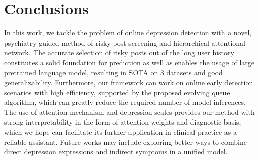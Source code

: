 \section{Conclusions}

In this work, we tackle the problem of online depression detection with a novel, psychiatry-guided method of risky post screening and hierarchical attentional network. The accurate selection of risky posts out of the long user history constitutes a solid foundation for prediction as well as enables the usage of large pretrained language model, resulting in SOTA on 3 datasets and good generalizability. Furthermore, our framework can work on online early detection scenarios with high efficiency, supported by the proposed evolving queue algorithm, which can greatly reduce the required number of model inferences. The use of attention mechanism and depression scales provides our method with strong interpretability in the form of attention weights and diagnostic basis, which we hope can facilitate its further application in clinical practice as a reliable assistant. Future works may include exploring better ways to combine direct depression expressions and indirect symptoms in a unified model.
